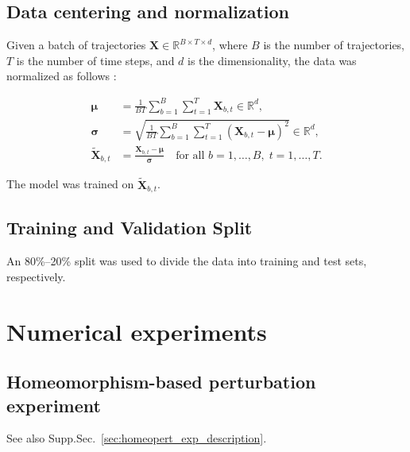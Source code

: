 \documentclass{article}
\theoremstyle{definition} \newtheorem{definition}{Definition}  \newtheorem{example}{Example}
\theoremstyle{remark} \newtheorem{remark}{Remark}
\newcounter{ct}
\begin{document}
\subsection{Data centering and normalization}
Given a batch of trajectories \( \mathbf{X} \in \mathbb{R}^{B \times T \times d} \), where \( B \) is the number of trajectories, \( T \) is the number of time steps, and \( d \) is the dimensionality, the data was normalized as follows :

\[
\begin{aligned}
\boldsymbol{\mu} &= \frac{1}{BT} \sum_{b=1}^B \sum_{t=1}^T \mathbf{X}_{b,t} \in \mathbb{R}^d, \\
\boldsymbol{\sigma} &= \sqrt{ \frac{1}{BT} \sum_{b=1}^B \sum_{t=1}^T \left( \mathbf{X}_{b,t} - \boldsymbol{\mu} \right)^2 } \in \mathbb{R}^d, \\
\tilde{\mathbf{X}}_{b,t} &= \frac{\mathbf{X}_{b,t} - \boldsymbol{\mu}}{\boldsymbol{\sigma}} \quad \text{for all } b = 1,\dots,B,\; t = 1,\dots,T.
\end{aligned}
\]

The model was trained on $\tilde{\mathbf{X}}_{b,t}$.

\subsection{Training and Validation Split}
An 80\%–20\% split was used to divide the data into training and test sets, respectively.




\newpage
\section{Numerical experiments}


\subsection{Homeomorphism-based perturbation experiment}\label{sec:homeopert_exp_details}
See also Supp.Sec.~\ref{sec:homeopert_exp_description}.
\end{document}

